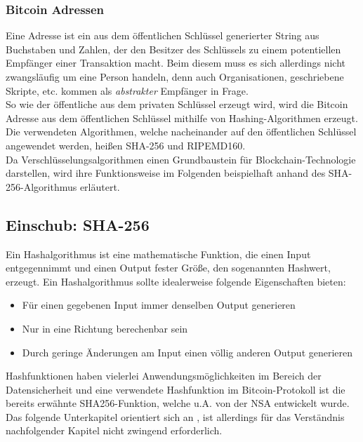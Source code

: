 \subsubsection{Bitcoin Adressen}
Eine Adresse ist ein aus dem öffentlichen Schlüssel generierter String aus Buchstaben und Zahlen, der den Besitzer des Schlüssels zu einem potentiellen Empfänger einer Transaktion macht. Beim diesem muss es sich allerdings nicht zwangsläufig um eine Person handeln, denn auch Organisationen, geschriebene Skripte, etc. kommen als \emph{abstrakter} Empfänger in Frage.\\
So wie der öffentliche aus dem privaten Schlüssel erzeugt wird, wird die Bitcoin Adresse aus dem öffentlichen Schlüssel mithilfe von Hashing-Algorithmen erzeugt. 
Die verwendeten Algorithmen, welche nacheinander auf den öffentlichen Schlüssel angewendet werden, heißen SHA-256 und RIPEMD160.\\
Da Verschlüsselungsalgorithmen einen Grundbaustein für Blockchain-Technologie darstellen, wird ihre Funktionsweise im Folgenden beispielhaft anhand des SHA-256-Algorithmus erläutert. 

\subsection{Einschub: SHA-256}
Ein Hashalgorithmus ist eine mathematische Funktion, die einen Input entgegennimmt und einen Output fester Größe, den sogenannten Hashwert, erzeugt. Ein Hashalgorithmus sollte idealerweise folgende Eigenschaften bieten:
\begin{itemize}
	\item Für einen gegebenen Input immer denselben Output generieren
	\item Nur in eine Richtung berechenbar sein
	\item Durch geringe Änderungen am Input einen völlig anderen Output generieren
\end{itemize}

Hashfunktionen haben vielerlei Anwendungsmöglichkeiten im Bereich der Datensicherheit und eine verwendete Hashfunktion im Bitcoin-Protokoll ist die bereits erwähnte SHA256-Funktion, welche u.A. von der NSA entwickelt wurde. Das folgende Unterkapitel orientiert sich an \cite{dang_2015}, ist allerdings für das Verständnis nachfolgender Kapitel nicht zwingend erforderlich.\\

